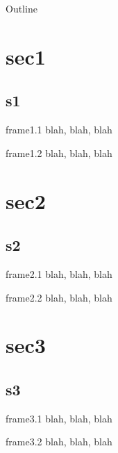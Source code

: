 \documentclass{beamer}
\begin{document}
    \begin{frame}{Outline}
        \tableofcontents
    \end{frame}

    \section{sec1}
    \subsection{s1}
    \begin{frame}{frame1.1}
        blah, blah, blah
    \end{frame}
    \begin{frame}{frame1.2}
        blah, blah, blah
    \end{frame}

    \section{sec2}
        \subsection{s2}
    \begin{frame}{frame2.1}
        blah, blah, blah
    \end{frame}
    \begin{frame}{frame2.2}
        blah, blah, blah
    \end{frame}

    \section{sec3}
    \subsection{s3}
    \begin{frame}{frame3.1}
        blah, blah, blah
    \end{frame}
    \begin{frame}{frame3.2}
        blah, blah, blah
    \end{frame}
\end{document}
